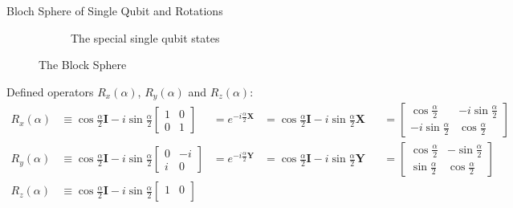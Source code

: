 \documentclass{beamer}
\begin{document}
\begin{frame}{Bloch Sphere of Single Qubit and Rotations}
{\begin{figure}
\begin{subfigure}[b]{0.5\textwidth}
        \caption{The special single qubit states\tiny\cite{singlequbitstates}}
      \end{subfigure}
      \caption{The Block Sphere}
    \end{figure}
    Defined operators $R_x(\alpha)$, $R_y(\alpha)$ and $R_z(\alpha)$:
    \begin{align*}
      R_x(\alpha) &\equiv \cos\frac{\alpha}2\mathbf{I} - i\sin\frac{\alpha}2
                                                                     \begin{bmatrix}
                                                                       1 & 0 \\
                                                                       0 & 1
                                                                     \end{bmatrix}
                  &= e^{-i\frac{\alpha}2\mathbf{X}}
                  &= \cos\frac{\alpha}2\mathbf{I} - i\sin\frac{\alpha}2 \mathbf{X}
                  &&=\begin{bmatrix}
                    \cos\frac{\alpha}2 & -i\sin\frac{\alpha}2 \\
                    -i\sin\frac{\alpha}2 & \cos\frac{\alpha}2
                    \end{bmatrix} \\
      R_y(\alpha) &\equiv \cos\frac{\alpha}2\mathbf{I} - i\sin\frac{\alpha}2
                                                                     \begin{bmatrix}
                                                                       0 & -i \\
                                                                       i & 0
                                                                     \end{bmatrix}
                  &= e^{-i\frac{\alpha}2\mathbf{Y}}
                  &= \cos\frac{\alpha}2\mathbf{I} - i\sin\frac{\alpha}2 \mathbf{Y}
                  &&=\begin{bmatrix}
                    \cos\frac{\alpha}2 & -\sin\frac{\alpha}2 \\
                    \sin\frac{\alpha}2 & \cos\frac{\alpha}2
                    \end{bmatrix} \\
      R_z(\alpha) &\equiv \cos\frac{\alpha}2\mathbf{I} - i\sin\frac{\alpha}2
                                                                     \begin{bmatrix}
                                                                       1 & 0 \\

\end{bmatrix}
\end{align*}}
\end{frame}
\end{document}
